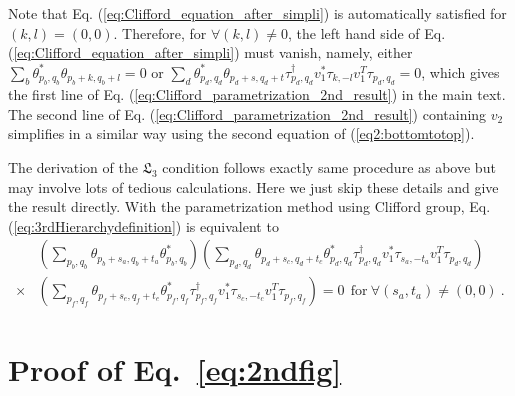 \documentclass[aps,prx,twocolumn,notitlepage,nofootinbib,nobalancelastpage]{revtex4-2}
\theoremstyle{break}
\newcommand{\1}{\mathbbm{1}}
\theoremstyle{plain}
\theoremstyle{plain}
\theoremstyle{plain}
\begin{document}
\begin{widetext}
Note that Eq. (\ref{eq:Clifford_equation_after_simpli}) is automatically
satisfied for $(k,l)=(0,0)$. Therefore, for $\forall(k,l)\neq0$,
the left hand side of Eq. (\ref{eq:Clifford_equation_after_simpli})
must vanish, namely, either $\sum_{b}\theta_{p_{b},q_{b}}^{*}\theta_{p_{b}+k,q_{b}+l}=0$
or $\sum_{d}\theta_{p_{d},q_{d}}^{*}\theta_{p_{d}+s,q_{d}+t}\tau_{p_{d},q_{d}}^{\dagger}v_{1}^{*}\tau_{k,-l}v_{1}^{T}\tau_{p_{d},q_{d}}=0$,
which gives the first line of Eq. (\ref{eq:Clifford_parametrization_2nd_result}) in the main text. The second
line of Eq. (\ref{eq:Clifford_parametrization_2nd_result}) containing $v_{2}$ simplifies in a similar way using the second equation of (\ref{eq2:bottomtotop}).

The derivation of the $\mathfrak{L}_3$ condition follows
 exactly same procedure as above but may involve lots of tedious
calculations. Here we just skip these details and give the result
directly. With the parametrization method using Clifford group, Eq.
(\ref{eq:3rdHierarchydefinition}) is equivalent to
\begin{align}
 & (\sum_{p_{b},q_{b}}\theta_{p_{b}+s_{a},q_{b}+t_{a}}\theta_{p_{b},q_{b}}^{*})(\sum_{p_{d},q_{d}}\theta_{p_{d}+s_{c},q_{d}+t_{c}}\theta_{p_{d},q_{d}}^{*}\tau_{p_{d},q_{d}}^{\dagger}v_{1}^{*}\tau_{s_{a},-t_{a}}v_{1}^{T}\tau_{p_{d},q_{d}})\nonumber \\
\times & (\sum_{p_{f},q_{f}}\theta_{p_{f}+s_{e},q_{f}+t_{e}}\theta_{p_{f},q_{f}}^{*}\tau_{p_{f},q_{f}}^{\dagger}v_{1}^{*}\tau_{s_{c},-t_{c}}v_{1}^{T}\tau_{p_{f},q_{f}})=0\ \ \mathrm{for}\ \forall(s_{a},t_{a})\neq(0,0) \ .
\end{align}
\end{widetext}


\newpage\null\newpage\null\newpage
\section{Proof of Eq.~\eqref{eq:2ndfig}}\label{app:proof2nd}
\end{document}
